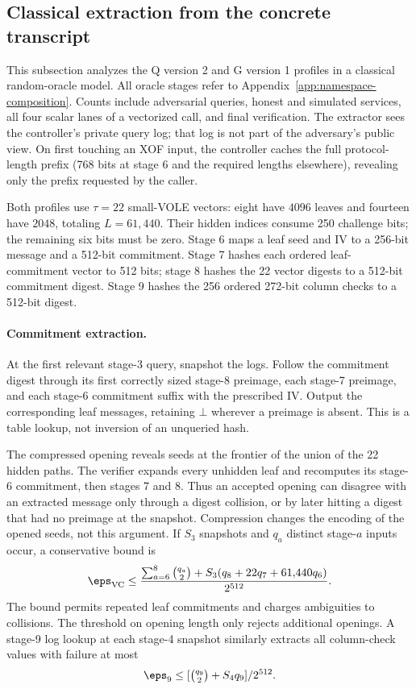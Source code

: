 \subsection{Classical extraction from the concrete transcript}\label{app:concrete-extraction}
This subsection analyzes the Q version 2 and G version 1 profiles in a classical random-oracle model. All oracle stages refer to Appendix~\ref{app:namespace-composition}. Counts include adversarial queries, honest and simulated services, all four scalar lanes of a vectorized call, and final verification. The extractor sees the controller's private query log; that log is not part of the adversary's public view. On first touching an XOF input, the controller caches the full protocol-length prefix (768 bits at stage 6 and the required lengths elsewhere), revealing only the prefix requested by the caller.

Both profiles use $\tau=22$ small-VOLE vectors: eight have $4096$ leaves and fourteen have $2048$, totaling $L=61{,}440$. Their hidden indices consume 250 challenge bits; the remaining six bits must be zero. Stage 6 maps a leaf seed and IV to a 256-bit message and a 512-bit commitment. Stage 7 hashes each ordered leaf-commitment vector to 512 bits; stage 8 hashes the 22 vector digests to a 512-bit commitment digest. Stage 9 hashes the 256 ordered 272-bit column checks to a 512-bit digest.

\paragraph{Commitment extraction.}
At the first relevant stage-3 query, snapshot the logs. Follow the commitment digest through its first correctly sized stage-8 preimage, each stage-7 preimage, and each stage-6 commitment suffix with the prescribed IV. Output the corresponding leaf messages, retaining $\bot$ wherever a preimage is absent. This is a table lookup, not inversion of an unqueried hash.

The compressed opening reveals seeds at the frontier of the union of the 22 hidden paths. The verifier expands every unhidden leaf and recomputes its stage-6 commitment, then stages 7 and 8. Thus an accepted opening can disagree with an extracted message only through a digest collision, or by later hitting a digest that had no preimage at the snapshot. Compression changes the encoding of the opened seeds, not this argument. If $S_3$ snapshots and $q_a$ distinct stage-$a$ inputs occur, a conservative bound is
\[
 \eps_{\rm VC}\le
 \frac{\sum_{a=6}^8\binom{q_a}{2}
       +S_3(q_8+22q_7+61{,}440q_6)}{2^{512}}.
\]
The bound permits repeated leaf commitments and charges ambiguities to collisions. The threshold on opening length only rejects additional openings. A stage-9 log lookup at each stage-4 snapshot similarly extracts all column-check values with failure at most
\[
 \eps_9\le[\tbinom{q_9}{2}+S_4q_9]/2^{512}.
\]

